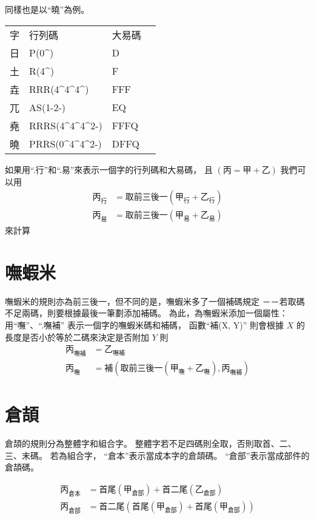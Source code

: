 \documentclass{article}
\def\tac{\textasciicircum}
\begin{document}
同樣也是以``曉''為例。
\begin{tabular}{llll}
字  & 行列碼 & 大易碼\\
日  & P(0\tac) & D\\
土  & R(4\tac) & F\\
垚  & RRR(4\tac4\tac4\tac) & FFF\\
兀  & AS(1-2-) & EQ\\
堯  & RRRS(4\tac4\tac4\tac2-) & FFFQ\\
曉  & PRRS(0\tac4\tac4\tac2-) & DFFQ\\
\end{tabular}

如果用``.行''和``.易''來表示一個字的行列碼和大易碼，
且 $(\mbox{丙}=\mbox{甲}+\mbox{乙})$
我們可以用
\begin{subequations}
  \begin{align}
  \mbox{丙}_{\mbox{行}}&=\mbox{取前三後一}(\mbox{甲}_{\mbox{行}}+\mbox{乙}_{\mbox{行}})\\
  \mbox{丙}_{\mbox{易}}&=\mbox{取前三後一}(\mbox{甲}_{\mbox{易}}+\mbox{乙}_{\mbox{易}})
  \end{align}
\end{subequations}
來計算

\section{嘸蝦米}
嘸蝦米的規則亦為前三後一，但不同的是，嘸蝦米多了一個補碼規定
－－若取碼不足兩碼，則要根據最後一筆劃添加補碼。
為此，為嘸蝦米添加一個屬性：
用``嘸''、``.嘸補'' 表示一個字的嘸蝦米碼和補碼，
函數``\mbox{補}(X, Y)'' 則會根據 $X$ 的長度是否小於等於二碼來決定是否附加 $Y$
則
\begin{subequations}
  \begin{align}
  \mbox{丙}_{\mbox{嘸補}}&=\mbox{乙}_{\mbox{嘸補}}\\
  \mbox{丙}_{\mbox{嘸}}&=\mbox{補}(\mbox{取前三後一}(\mbox{甲}_{\mbox{嘸}}+\mbox{乙}_{\mbox{嘸}}),
                          \mbox{丙}_{\mbox{嘸補}})
  \end{align}
\end{subequations}
\section{倉頡}
倉頡的規則分為整體字和組合字。
整體字若不足四碼則全取，否則取首、二、三、末碼。
若為組合字，
``倉本''表示當成本字的倉頡碼。
``倉部''表示當成部件的倉頡碼。

\begin{subequations}
  \begin{align}
  \mbox{丙}_{\mbox{倉本}}&=\mbox{首尾}(\mbox{甲}_{\mbox{倉部}})
      + \mbox{首二尾}({\mbox{乙}_{\mbox{倉部}}})\\
  \mbox{丙}_{\mbox{倉部}}&= \mbox{首二尾}(
      \mbox{首尾}(\mbox{甲}_{\mbox{倉部}})
      + \mbox{首尾}(\mbox{甲}_{\mbox{倉部}})
      )
  \end{align}
\end{subequations}
\end{document}
